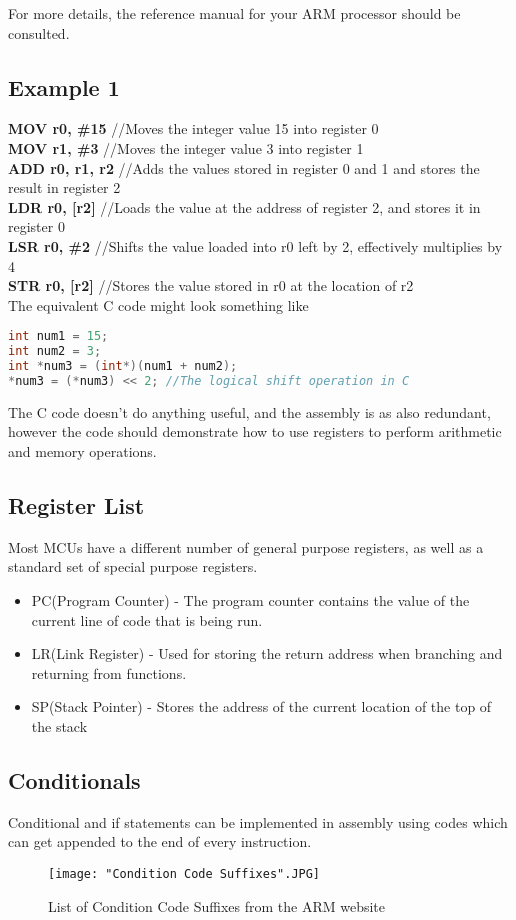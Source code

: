\documentclass[10pt]{article}
\begin{document}
For more details, the reference manual for your ARM processor should be consulted.\\

\subsection{Example 1}
\textbf{MOV r0, \#15} //Moves the integer value 15 into register 0\\ 
\textbf{MOV r1, \#3} //Moves the integer value 3 into register 1\\
\textbf{ADD r0, r1, r2} //Adds the values stored in register 0 and 1 and stores the result in register 2\\
\textbf{LDR r0, [r2]} //Loads the value at the address of register 2, and stores it in register 0\\
\textbf{LSR r0, \#2} //Shifts the value loaded into r0 left by 2, effectively multiplies by 4\\
\textbf{STR r0, [r2]} //Stores the value stored in r0 at the location of r2\\

The equivalent C code might look something like
\begin{lstlisting}[language=C]
int num1 = 15;
int num2 = 3;
int *num3 = (int*)(num1 + num2);
*num3 = (*num3) << 2; //The logical shift operation in C
\end{lstlisting}

The C code doesn't do anything useful, and the assembly is as also redundant, however the code should demonstrate how to use registers to perform arithmetic and memory operations.

\subsection{Register List}
Most MCUs have a different number of general purpose registers, as well as a standard set of special purpose registers.
\begin{itemize}
\item PC(Program Counter) - The program counter contains the value of the current line of code that is being run.
\item LR(Link Register) - Used for storing the return address when branching and returning from functions.
\item SP(Stack Pointer) - Stores the address of the current location of the top of the stack
\end{itemize}

\subsection{Conditionals}
Conditional and if statements can be implemented in assembly using codes which can get appended to the end of every instruction. 
\begin{figure}[H]
\texttt{[image: "Condition Code Suffixes".JPG]}
\caption{List of Condition Code Suffixes from the ARM website}
\end{figure}
\end{document}
